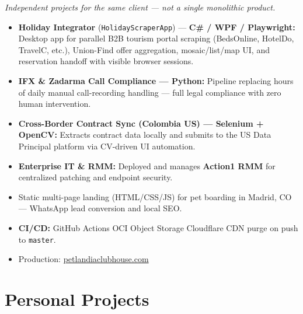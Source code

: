 \vspace{4pt}


\textit{Independent projects for the same client — not a single monolithic product.}

\begin{itemize}
  \item \textbf{Holiday Integrator} (\texttt{HolidayScraperApp}) — \textbf{C\# / WPF / Playwright:}
        Desktop app for parallel B2B tourism portal scraping (BedsOnline, HotelDo, TravelC, etc.),
        Union-Find offer aggregation, mosaic/list/map UI, and reservation handoff with visible browser sessions.

  \item \textbf{IFX \& Zadarma Call Compliance — Python:}
        Pipeline replacing hours of daily manual call-recording handling — full legal compliance with zero human intervention.

  \item \textbf{Cross-Border Contract Sync (Colombia \textrightarrow{} US) — Selenium + OpenCV:}
        Extracts contract data locally and submits to the US Data Principal platform via CV-driven UI automation.

  \item \textbf{Enterprise IT \& RMM:}
        Deployed and manages \textbf{Action1 RMM} for centralized patching and endpoint security.
\end{itemize}

\vspace{4pt}


\begin{itemize}
  \item Static multi-page landing (HTML/CSS/JS) for pet boarding in Madrid, CO — WhatsApp lead conversion and local SEO.
  \item \textbf{CI/CD:} GitHub Actions \textrightarrow{} OCI Object Storage \textrightarrow{} Cloudflare CDN purge on push to \texttt{master}.
  \item Production: \href{https://petlandiaclubhouse.com}{petlandiaclubhouse.com}
\end{itemize}

\section*{Personal Projects}

